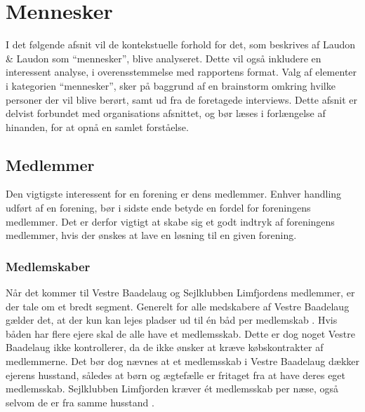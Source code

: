 







\section{Mennesker}

I det følgende afsnit vil de kontekstuelle forhold for det, som beskrives af Laudon \& Laudon som \enquote{mennesker}, blive analyseret. Dette vil også inkludere en interessent analyse, i overensstemmelse med rapportens format. Valg af elementer i kategorien \enquote{mennesker}, sker på baggrund af en brainstorm omkring hvilke personer der vil blive berørt, samt ud fra de foretagede interviews. Dette afsnit er delvist forbundet med organisations afsnittet, og bør læses i forlængelse af hinanden, for at opnå en samlet forståelse.

\subsection{Medlemmer}

Den vigtigste interessent for en forening er dens medlemmer. Enhver handling udført af en forening, bør i sidste ende betyde en fordel for foreningens medlemmer. Det er derfor vigtigt at skabe sig et godt indtryk af foreningens medlemmer, hvis der ønskes at lave en løsning til en given forening.

\subsubsection{Medlemskaber}

Når det kommer til Vestre Baadelaug og Sejlklubben Limfjordens medlemmer, er der tale om et bredt segment. Generelt for alle medskabere af Vestre Baadelaug gælder det, at der kun kan lejes pladser ud til én båd per medlemskab \cite{vestre_vedtagter}. Hvis båden har flere ejere skal de alle have et medlemsskab. Dette er dog noget Vestre Baadelaug ikke kontrollerer, da de ikke ønsker at kræve købskontrakter af medlemmerne. Det bør dog nævnes at et medlemsskab i Vestre Baadelaug dækker ejerens husstand, således at børn og ægtefælle er fritaget fra at have deres eget medlemsskab. Sejlklubben Limfjorden kræver ét medlemsskab per næse, også selvom de er fra samme husstand \cite{int_vb_sl}.

